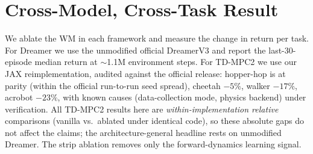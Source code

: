 \documentclass[twocolumn,10pt]{article}
\begin{document}
\section{Cross-Model, Cross-Task Result}
\label{sec:cross}
We ablate the WM in each framework and measure the change in return per task.
For Dreamer we use the unmodified official DreamerV3 and report the
last-30-episode median return at $\sim$1.1M environment steps. For TD-MPC2 we
use our JAX reimplementation, audited against the official release: hopper-hop
is at parity (within the official run-to-run seed spread), cheetah $-5\%$,
walker $-17\%$, acrobot $-23\%$, with known causes (data-collection mode,
physics backend) under verification. All TD-MPC2 results here are
\emph{within-implementation relative} comparisons (vanilla vs.\ ablated under
identical code), so these absolute gaps do not affect the claims; the
architecture-general headline rests on unmodified Dreamer. The strip ablation
removes only the forward-dynamics learning signal.
\end{document}

